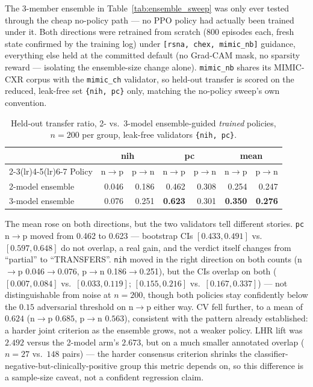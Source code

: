 \documentclass[11pt]{article}
\begin{document}
The 3-member ensemble in Table~\ref{tab:ensemble_sweep} was only ever
tested through the cheap no-policy path — no PPO policy had actually been
trained under it. Both directions were retrained from scratch (800
episodes each, fresh state confirmed by the training log) under
\texttt{[rsna, chex, mimic\_nb]} guidance, everything else held at the
committed default (no Grad-CAM mask, no sparsity reward — isolating the
ensemble-size change alone). \texttt{mimic\_nb} shares its MIMIC-CXR
corpus with the \texttt{mimic\_ch} validator, so held-out transfer is
scored on the reduced, leak-free set \texttt{\{nih, pc\}} only, matching
the no-policy sweep's own convention.

\begin{table}[h]
\centering
\caption{Held-out transfer ratio, 2- vs.\ 3-model ensemble-guided
\emph{trained} policies, $n=200$ per group, leak-free validators
\texttt{\{nih, pc\}}.}
\label{tab:ensemble3_transfer}
\begin{tabular}{@{}lrrrrrr@{}}
\toprule
& \multicolumn{2}{c}{nih} & \multicolumn{2}{c}{pc} & \multicolumn{2}{c}{mean} \\
\cmidrule(lr){2-3}\cmidrule(lr){4-5}\cmidrule(lr){6-7}
Policy & n$\to$p & p$\to$n & n$\to$p & p$\to$n & n$\to$p & p$\to$n \\
\midrule
2-model ensemble & 0.046 & 0.186 & 0.462 & 0.308 & 0.254 & 0.247 \\
3-model ensemble & 0.076 & 0.251 & \textbf{0.623} & 0.301 & \textbf{0.350} & \textbf{0.276} \\
\bottomrule
\end{tabular}
\end{table}

The mean rose on both directions, but the two validators tell different
stories. \texttt{pc} n$\to$p moved from 0.462 to 0.623 — bootstrap CIs
$[0.433, 0.491]$ vs.\ $[0.597, 0.648]$ do not overlap, a real gain, and
the verdict itself changes from ``partial'' to ``TRANSFERS''.
\texttt{nih} moved in the right direction on both counts (n$\to$p
0.046$\to$0.076, p$\to$n 0.186$\to$0.251), but the CIs overlap on both
($[0.007,0.084]$ vs.\ $[0.033,0.119]$; $[0.155,0.216]$ vs.\
$[0.167,0.337]$) — not distinguishable from noise at $n=200$, though both
policies stay confidently below the $0.15$ adversarial threshold on
n$\to$p either way. CV fell further, to a mean of $0.624$ (n$\to$p
$0.685$, p$\to$n $0.563$), consistent with the pattern already
established: a harder joint criterion as the ensemble grows, not a
weaker policy. LHR lift was $2.492$ versus the 2-model arm's $2.673$, but
on a much smaller annotated overlap ($n=27$ vs.\ $148$ pairs) — the harder
consensus criterion shrinks the classifier-negative-but-clinically-positive
group this metric depends on, so this difference is a sample-size
caveat, not a confident regression claim.
\end{document}
